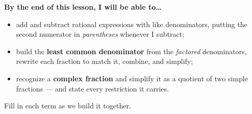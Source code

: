 \documentclass[10pt]{article}
\begin{document}
\namedateperiod

\vspace{0.08in}

\begin{objectivebox}
\textbf{By the end of this lesson, I will be able to\dots}
\begin{itemize}\setlength{\itemsep}{2pt}
  \item add and subtract rational expressions with like denominators, putting the second numerator in \emph{parentheses} whenever I subtract;
  \item build the \textbf{least common denominator} from the \emph{factored} denominators, rewrite each fraction to match it, combine, and simplify;
  \item recognize a \textbf{complex fraction} and simplify it as a quotient of two simple fractions --- and state every restriction it carries.
\end{itemize}
\end{objectivebox}

\vspace{0.05in}

\begin{vocabbox}
\small
Fill in each term as we build it together.
\par\vspace{2pt}   %
\end{vocabbox}
\end{document}
